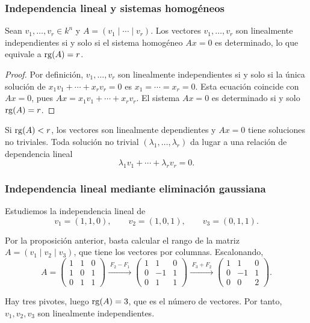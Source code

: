 \begin{frame}
    \frametitle{Independencia lineal y sistemas homogéneos}

    \begin{proposition}
        Sean $v_1,\ldots,v_r\in k^n$ y $A=(v_1\mid\cdots\mid v_r)$.
        Los vectores $v_1,\ldots,v_r$ son linealmente independientes
        si y solo si el sistema homogéneo $Ax=0$ es determinado,
        lo que equivale a $\operatorname{rg}(A)=r$.
    \end{proposition}

    \begin{proof}
        Por definición, $v_1,\ldots,v_r$ son linealmente independientes
        si y solo si la única solución de $x_1v_1+\cdots+x_rv_r=0$
        es $x_1=\cdots=x_r=0$.
        Esta ecuación coincide con $Ax=0$, pues $Ax=x_1v_1+\cdots+x_rv_r$.
        El sistema $Ax=0$ es determinado si y solo $\operatorname{rg}(A)=r$.
    \end{proof}

    Si $\operatorname{rg}(A)<r$, los vectores son linealmente dependientes
    y $Ax=0$ tiene soluciones no triviales.
    Toda solución no trivial $(\lambda_1,\ldots,\lambda_r)$ da lugar a una 
    relación de dependencia lineal \[\lambda_1v_1+\cdots+\lambda_rv_r=0.\]
\end{frame}



\begin{frame}
    \frametitle{Independencia lineal mediante eliminación gaussiana}

    \begin{example}
        Estudiemos la independencia lineal de
        \[
            v_1=(1,1,0),\qquad
            v_2=(1,0,1),\qquad
            v_3=(0,1,1).
        \]

        Por la proposición anterior, basta calcular el rango de la matriz
        \(A=(v_1\mid v_2\mid v_3)\), que tiene los vectores por columnas.
        Escalonando,
        \[
            A=
            \begin{pmatrix}
                1&1&0\\
                1&0&1\\
                0&1&1
            \end{pmatrix}
            \xrightarrow{\;F_2-F_1\;}
            \begin{pmatrix}
                1&1&0\\
                0&-1&1\\
                0&1&1
            \end{pmatrix}
            \xrightarrow{\;F_3+F_2\;}
            \begin{pmatrix}
                1&1&0\\
                0&-1&1\\
                0&0&2
            \end{pmatrix}.
        \]

        Hay tres pivotes, luego \(\operatorname{rg}(A)=3\), que es el número de vectores.
        Por tanto, \(v_1,v_2,v_3\) son linealmente independientes.
    \end{example}
\end{frame}





